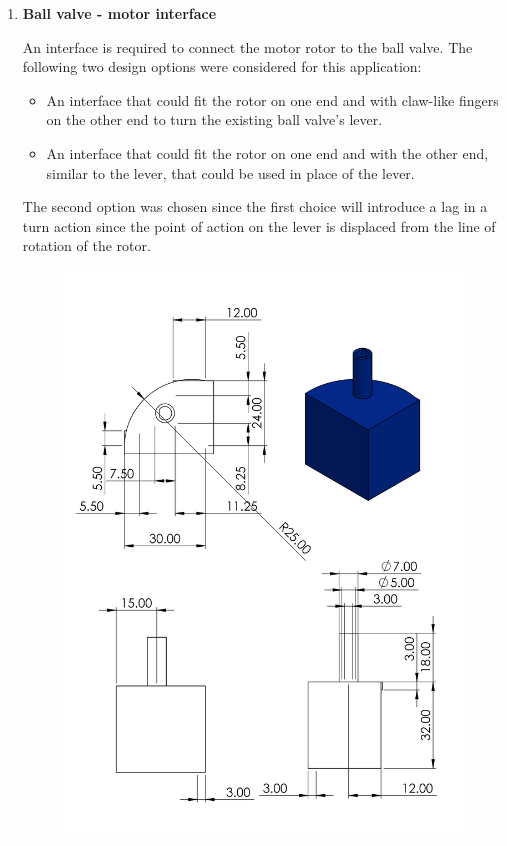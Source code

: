 \begin{enumerate}
\begin{enumerate}
    \item \textbf{Ball valve - motor interface}
    \par
    An interface is required to connect the motor rotor to the ball valve. The following  two design options were considered for this application:
    \begin{itemize}
        \item An interface that could fit the rotor on one end and with claw-like fingers on the other end to turn the existing ball valve's lever.
        \item An interface that could fit the rotor on one end and with the other end, similar to the lever, that could be used in place of the lever.
    \end{itemize}
    \par
    The second option was chosen since the first choice will introduce a lag in a turn action since the point of action on the lever is displaced from the line of rotation of the rotor.
    \begin{figure}[H]
        \centering
        \includegraphics[height=0.5\textheight]{Figures/interface.PNG}

\end{figure}
\end{enumerate}
\end{enumerate}
